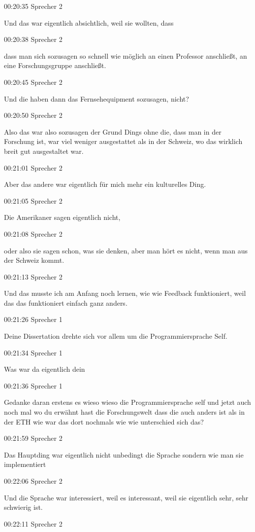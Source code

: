 00:20:35 Sprecher 2

Und das war eigentlich absichtlich, weil sie wollten, dass

00:20:38 Sprecher 2

dass man sich sozusagen so schnell wie möglich an einen Professor
anschließt, an eine Forschungsgruppe anschließt.

00:20:45 Sprecher 2

Und die haben dann das Fernsehequipment sozusagen, nicht?

00:20:50 Sprecher 2

Also das war also sozusagen der Grund Dings ohne die, dass man in der
Forschung ist, war viel weniger ausgestattet als in der Schweiz, wo das
wirklich breit gut ausgestaltet war.

00:21:01 Sprecher 2

Aber das andere war eigentlich für mich mehr ein kulturelles Ding.

00:21:05 Sprecher 2

Die Amerikaner sagen eigentlich nicht,

00:21:08 Sprecher 2

oder also sie sagen schon, was sie denken, aber man hört es nicht, wenn
man aus der Schweiz kommt.

00:21:13 Sprecher 2

Und das musste ich am Anfang noch lernen, wie wie Feedback funktioniert,
weil das das funktioniert einfach ganz anders.

00:21:26 Sprecher 1

Deine Dissertation drehte sich vor allem um die Programmiersprache Self.

00:21:34 Sprecher 1

Was war da eigentlich dein

00:21:36 Sprecher 1

Gedanke daran erstens es wieso wieso die Programmiersprache self und
jetzt auch noch mal wo du erwähnt hast die Forschungswelt dass die auch
anders ist als in der ETH wie war das dort nochmals wie wie unterschied
sich das?

00:21:59 Sprecher 2

Das Hauptding war eigentlich nicht unbedingt die Sprache sondern wie man
sie implementiert

00:22:06 Sprecher 2

Und die Sprache war interessiert, weil es interessant, weil sie
eigentlich sehr, sehr schwierig ist.

00:22:11 Sprecher 2

